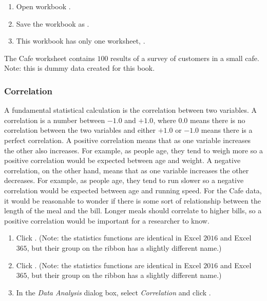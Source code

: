 \begin{enumerate}[resume]	
	\item Open workbook .
	\item Save the workbook as .
	\item This workbook has only one worksheet, .
\end{enumerate}

The Cafe worksheet contains $ 100 $ results of a survey of customers in a small cafe. Note: this is dummy data created for this book.

\subsubsection{Correlation}

A fundamental statistical calculation is the correlation between two variables. A correlation is a number between $ -1.0 $ and $ +1.0 $, where $ 0.0 $ means there is no correlation between the two variables and either $ +1.0 $ or $ -1.0 $ means there is a perfect correlation. A positive correlation means that as one variable increases the other also increases. For example, as people age, they tend to weigh more so a positive correlation would be expected between age and weight. A negative correlation, on the other hand, means that as one variable increases the other decreases. For example, as people age, they tend to run slower so a negative correlation would be expected between age and running speed. For the Cafe data, it would be reasonable to wonder if there is some sort of relationship between the length of the meal and the bill. Longer meals should correlate to higher bills, so a positive correlation would be important for a researcher to know.

\begin{enumerate}[resume]
	\item {} Click . (Note: the statistics functions are identical in Excel $ 2016 $ and Excel $ 365 $, but their group on the ribbon has a slightly different name.)
	\item {} Click . (Note: the statistics functions are identical in Excel $ 2016 $ and Excel $ 365 $, but their group on the ribbon has a slightly different name.)
	\item In the \textit{Data Analysis} dialog box, select \textit{Correlation} and click .
\end{enumerate}


